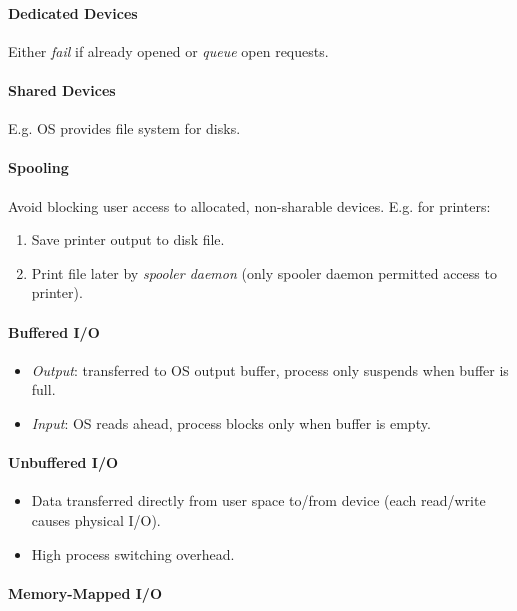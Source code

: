 \documentclass[twocolumn,english]{article}
\begin{document}
\paragraph{Dedicated Devices}

Either \emph{fail} if already opened or \emph{queue} open requests.

\paragraph{Shared Devices}

E.g. OS provides file system for disks.

\paragraph{Spooling}

Avoid blocking user access to allocated, non-sharable devices. E.g.
for printers:
\begin{enumerate}
\item Save printer output to disk file.
\item Print file later by \emph{spooler daemon} (only spooler daemon permitted
access to printer).
\end{enumerate}

\paragraph{Buffered I/O}
\begin{itemize}
\item \emph{Output}: transferred to OS output buffer, process only suspends
when buffer is full.
\item \emph{Input}: OS reads ahead, process blocks only when buffer is empty.
\end{itemize}

\paragraph{Unbuffered I/O}
\begin{itemize}
\item Data transferred directly from user space to/from device (each read/write
causes physical I/O).
\item High process switching overhead.
\end{itemize}

\paragraph{Memory-Mapped I/O}
\end{document}
